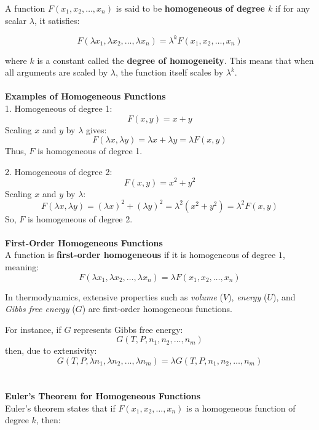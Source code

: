 \documentclass{article}
\theoremstyle{definition}
\begin{document}
\begin{mdframed}[style=MyFrame, frametitle={Definition of Homogeneous Functions}]
    

A function $F(x_1, x_2, \dots, x_n)$ is said to be \textbf{homogeneous of degree $k$} if for any scalar $\lambda$, it satisfies:

\begin{equation}
    F(\lambda x_1, \lambda x_2, \dots, \lambda x_n) = \lambda^k F(x_1, x_2, \dots, x_n)
\end{equation}

where $k$ is a constant called the \textbf{degree of homogeneity}. This means that when all arguments are scaled by $\lambda$, the function itself scales by $\lambda^k$.
\\
\\
\textbf{Examples of Homogeneous Functions}\\
1. Homogeneous of degree 1:
   \begin{equation}
       F(x, y) = x + y
   \end{equation}
   Scaling $x$ and $y$ by $\lambda$ gives:
   \begin{equation}
       F(\lambda x, \lambda y) = \lambda x + \lambda y = \lambda F(x, y)
   \end{equation}
   Thus, $F$ is homogeneous of degree 1.

2. Homogeneous of degree 2:
   \begin{equation}
       F(x, y) = x^2 + y^2
   \end{equation}
   Scaling $x$ and $y$ by $\lambda$:
   \begin{equation}
       F(\lambda x, \lambda y) = (\lambda x)^2 + (\lambda y)^2 = \lambda^2 (x^2 + y^2) = \lambda^2 F(x, y)
   \end{equation}
   So, $F$ is homogeneous of degree 2.
\\
\\
\textbf{First-Order Homogeneous Functions}\\
A function is \textbf{first-order homogeneous} if it is homogeneous of degree $1$, meaning:
\begin{equation}
    F(\lambda x_1, \lambda x_2, \dots, \lambda x_n) = \lambda F(x_1, x_2, \dots, x_n)
\end{equation}

In thermodynamics, extensive properties such as \textit{volume} ($V$), \textit{energy} ($U$), and \textit{Gibbs free energy} ($G$) are first-order homogeneous functions.

For instance, if $G$ represents Gibbs free energy:
\begin{equation}
    G(T, P, n_1, n_2, \dots, n_m)
\end{equation}
then, due to extensivity:
\begin{equation}
    G(T, P, \lambda n_1, \lambda n_2, \dots, \lambda n_m) = \lambda G(T, P, n_1, n_2, \dots, n_m)
\end{equation}
\\
\\
\textbf{Euler’s Theorem for Homogeneous Functions}
\\
Euler’s theorem states that if $F(x_1, x_2, \dots, x_n)$ is a homogeneous function of degree $k$, then:


\end{mdframed}
\end{document}
